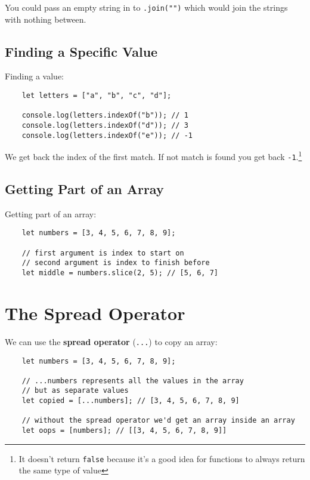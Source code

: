You could pass an empty string in to \texttt{.join("")} which would join the strings with nothing between.

\subsection{Finding a Specific Value}

Finding a value:

\begin{verbatim}
    let letters = ["a", "b", "c", "d"];

    console.log(letters.indexOf("b")); // 1
    console.log(letters.indexOf("d")); // 3
    console.log(letters.indexOf("e")); // -1
\end{verbatim}

We get back the index of the first match. If not match is found you get back \texttt{-1}.\footnote{It doesn't return \texttt{false} because it's a good idea for functions to always return the same type of value}

\subsection{Getting Part of an Array}

Getting part of an array:

\begin{verbatim}
    let numbers = [3, 4, 5, 6, 7, 8, 9];

    // first argument is index to start on
    // second argument is index to finish before
    let middle = numbers.slice(2, 5); // [5, 6, 7]
\end{verbatim}

\pagebreak

\section{The Spread Operator}

We can use the \textbf{spread operator} (\texttt{...}) to copy an array:

\begin{verbatim}
    let numbers = [3, 4, 5, 6, 7, 8, 9];

    // ...numbers represents all the values in the array
    // but as separate values
    let copied = [...numbers]; // [3, 4, 5, 6, 7, 8, 9]

    // without the spread operator we'd get an array inside an array
    let oops = [numbers]; // [[3, 4, 5, 6, 7, 8, 9]]
\end{verbatim}

